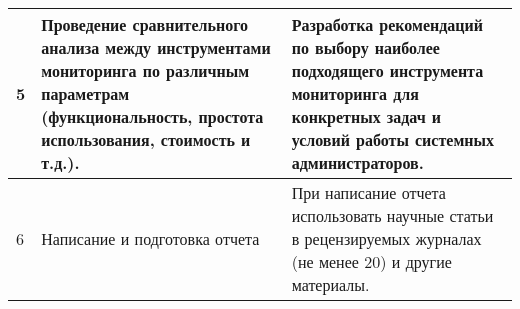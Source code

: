 \begin{longtable}{|l|p{6cm}|p{6cm}|}
    5       & Проведение сравнительного анализа между инструментами мониторинга по различным параметрам (функциональность, простота использования, стоимость и т.д.). & Разработка рекомендаций по выбору наиболее подходящего инструмента мониторинга для конкретных задач и условий работы системных администраторов.                      \\ \hline
    6       & Написание и подготовка отчета                                                                                                                           & При написание отчета использовать научные статьи в рецензируемых журналах (не менее 20) и другие материалы.                                                          \\ \hline
\end{longtable}

\clearpage
